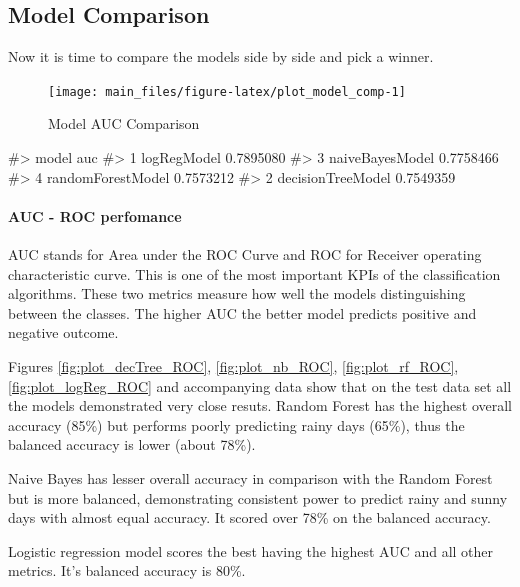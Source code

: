 \hypertarget{model-comparison}{%
\subsection{Model Comparison}\label{model-comparison}}

Now it is time to compare the models side by side and pick a winner.

\begin{Schunk}
\begin{figure}[H]

{\centering \texttt{[image: main\_files/figure-latex/plot\_model\_comp-1]} 

}

\caption[Model AUC Comparison]{Model AUC Comparison}\label{fig:plot_model_comp}
\end{figure}
\begin{Soutput}
#>               model       auc
#> 1       logRegModel 0.7895080
#> 3   naiveBayesModel 0.7758466
#> 4 randomForestModel 0.7573212
#> 2 decisionTreeModel 0.7549359
\end{Soutput}
\end{Schunk}

\hypertarget{auc---roc-perfomance}{%
\paragraph{AUC - ROC perfomance}\label{auc---roc-perfomance}}

AUC stands for Area under the ROC Curve and ROC for Receiver operating
characteristic curve. This is one of the most important KPIs of the
classification algorithms. These two metrics measure how well the models
distinguishing between the classes. The higher AUC the better model
predicts positive and negative outcome.

Figures \ref{fig:plot_decTree_ROC}, \ref{fig:plot_nb_ROC},
\ref{fig:plot_rf_ROC}, \ref{fig:plot_logReg_ROC} and accompanying data
show that on the test data set all the models demonstrated very close
resuts. Random Forest has the highest overall accuracy (85\%) but
performs poorly predicting rainy days (65\%), thus the balanced accuracy
is lower (about 78\%).

Naive Bayes has lesser overall accuracy in comparison with the Random
Forest but is more balanced, demonstrating consistent power to predict
rainy and sunny days with almost equal accuracy. It scored over 78\% on
the balanced accuracy.

Logistic regression model scores the best having the highest AUC and all
other metrics. It's balanced accuracy is 80\%.

